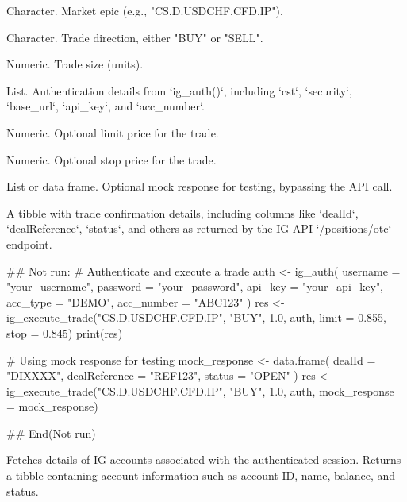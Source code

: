 \documentclass[a4paper]{book}
\begin{document}
%
\begin{Arguments}
\begin{ldescription}
\item[\code{epic}] Character. Market epic (e.g., "CS.D.USDCHF.CFD.IP").

\item[\code{direction}] Character. Trade direction, either "BUY" or "SELL".

\item[\code{size}] Numeric. Trade size (units).

\item[\code{auth}] List. Authentication details from `ig\_auth()`, including `cst`, `security`, `base\_url`, `api\_key`, and `acc\_number`.

\item[\code{limit}] Numeric. Optional limit price for the trade.

\item[\code{stop}] Numeric. Optional stop price for the trade.

\item[\code{mock\_response}] List or data frame. Optional mock response for testing, bypassing the API call.
\end{ldescription}
\end{Arguments}
%
\begin{Value}
A tibble with trade confirmation details, including columns like `dealId`, `dealReference`, `status`, and others as returned by the IG API `/positions/otc` endpoint.
\end{Value}
%
\begin{Examples}
\begin{ExampleCode}
## Not run: 
# Authenticate and execute a trade
auth <- ig_auth(
  username = "your_username",
  password = "your_password",
  api_key = "your_api_key",
  acc_type = "DEMO",
  acc_number = "ABC123"
)
res <- ig_execute_trade("CS.D.USDCHF.CFD.IP", "BUY", 1.0, auth, limit = 0.855, stop = 0.845)
print(res)

# Using mock response for testing
mock_response <- data.frame(
  dealId = "DIXXXX",
  dealReference = "REF123",
  status = "OPEN"
)
res <- ig_execute_trade("CS.D.USDCHF.CFD.IP", "BUY", 1.0, auth, mock_response = mock_response)

## End(Not run)

\end{ExampleCode}
\end{Examples}
%
\begin{Description}
Fetches details of IG accounts associated with the authenticated session.
Returns a tibble containing account information such as account ID, name, balance, and status.
\end{Description}
\end{document}
